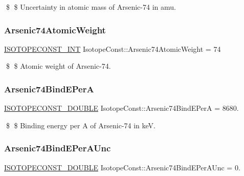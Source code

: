 \$ \$ Uncertainty in atomic mass of Arsenic-\/74 in amu. \mbox{\label{group___isotope_const-_arsenic-_as74_gab3b5a4eeaf01709e0c89645362a373be}} 
\subsubsection{\texorpdfstring{Arsenic74\+Atomic\+Weight}{Arsenic74AtomicWeight}}
{\footnotesize\ttfamily \mbox{\hyperlink{group___isotope_const-_macros_ga5f18360b3e99483a35c32d789e62621c}{I\+S\+O\+T\+O\+P\+E\+C\+O\+N\+S\+T\+\_\+\+I\+NT}} Isotope\+Const\+::\+Arsenic74\+Atomic\+Weight = 74}

\$ \$ Atomic weight of Arsenic-\/74. \mbox{\label{group___isotope_const-_arsenic-_as74_ga9d225e8cc3ba7cec9df7b21e917ccf78}} 
\subsubsection{\texorpdfstring{Arsenic74\+Bind\+E\+PerA}{Arsenic74BindEPerA}}
{\footnotesize\ttfamily \mbox{\hyperlink{group___isotope_const-_macros_ga8f45a7272ce02c0b4c65c44636ed719a}{I\+S\+O\+T\+O\+P\+E\+C\+O\+N\+S\+T\+\_\+\+D\+O\+U\+B\+LE}} Isotope\+Const\+::\+Arsenic74\+Bind\+E\+PerA = 8680.}

\$ \$ Binding energy per A of Arsenic-\/74 in keV. \mbox{\label{group___isotope_const-_arsenic-_as74_ga3a281f3205692f40d6c7d56023d85637}} 
\subsubsection{\texorpdfstring{Arsenic74\+Bind\+E\+Per\+A\+Unc}{Arsenic74BindEPerAUnc}}
{\footnotesize\ttfamily \mbox{\hyperlink{group___isotope_const-_macros_ga8f45a7272ce02c0b4c65c44636ed719a}{I\+S\+O\+T\+O\+P\+E\+C\+O\+N\+S\+T\+\_\+\+D\+O\+U\+B\+LE}} Isotope\+Const\+::\+Arsenic74\+Bind\+E\+Per\+A\+Unc = 0.}

